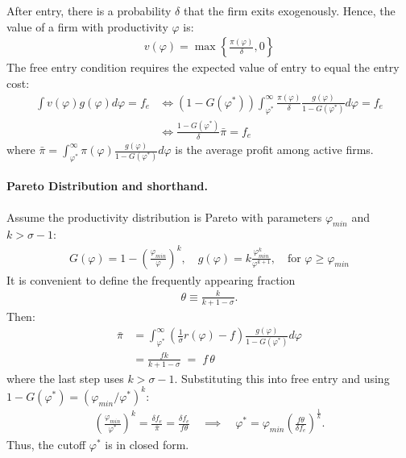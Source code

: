 \begin{solution}
    After entry, there is a probability $\delta$ that the firm exits exogenously. Hence, the value of a firm with productivity $\varphi$ is:
    \begin{align*}
        v(\varphi) = \max\left\{\frac{\pi(\varphi)}{\delta}, 0\right\}
    \end{align*}
    The free entry condition requires the expected value of entry to equal the entry cost:
    \begin{align*}
        \int v(\varphi) g(\varphi) d\varphi = f_e &\iff (1-G(\varphi^*))\int_{\varphi^*}^{\infty} \frac{\pi(\varphi)}{\delta} \frac{g(\varphi)}{1 - G(\varphi^*)} d\varphi = f_e \\
        &\iff \frac{1-G(\varphi^*)}{\delta} \bar{\pi} = f_e
    \end{align*}
    where $\bar{\pi} = \int_{\varphi^*}^{\infty} \pi(\varphi) \frac{g(\varphi)}{1 - G(\varphi^*)} d\varphi$ is the average profit among active firms.

    \paragraph{Pareto Distribution and shorthand.} Assume the productivity distribution is Pareto with parameters $\varphi_{min}$ and $k > \sigma - 1$:
    \begin{align*}
        G(\varphi) = 1 - \left( \frac{\varphi_{min}}{\varphi} \right)^k, \quad g(\varphi) = k \frac{\varphi_{min}^k}{\varphi^{k+1}}, \quad \text{for } \varphi \geq \varphi_{min}
    \end{align*}
    It is convenient to define the frequently appearing fraction
    \begin{align*}
        \theta \equiv \frac{k}{k+1-\sigma}.
    \end{align*}
    Then:
    \begin{align*}
        \bar{\pi} &= \int_{\varphi^*}^{\infty} \left( \frac{1}{\sigma} r(\varphi) - f \right) \frac{g(\varphi)}{1 - G(\varphi^*)} d\varphi \\
        &= \frac{fk}{k + 1 - \sigma} \;=\; f\,\theta
    \end{align*}
    where the last step uses $k > \sigma - 1$. Substituting this into free entry and using $1-G(\varphi^*)=(\varphi_{min}/\varphi^*)^k$:
    \begin{align*}
        \left(\frac{\varphi_{min}}{\varphi^*}\right)^k = \frac{\delta f_e}{\bar{\pi}} = \frac{\delta f_e}{f\theta}
        \quad\implies\quad
        \varphi^* = \varphi_{min}\left(\frac{f\theta}{\delta f_e}\right)^{\frac{1}{k}}.
    \end{align*}
    Thus, the cutoff $\varphi^*$ is in closed form. 


\end{solution}

